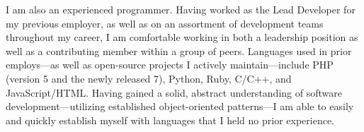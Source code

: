 \begin{cvletter}
I am also an experienced programmer. Having worked as the Lead Developer for my previous employer, as well as on an
assortment of development teams throughout my career, I am comfortable working in both a leadership position as well as
a contributing member within a group of peers. Languages used in prior employs---as well as open-source projects
I actively maintain---include PHP (version 5 and the newly released 7), Python, Ruby, C/C++, and JavaScript/HTML. Having
gained a solid, abstract understanding of software development---utilizing established object-oriented patterns---I am
able to easily and quickly establish myself with languages that I held no prior experience.

\end{cvletter}


\makeletterclosing

